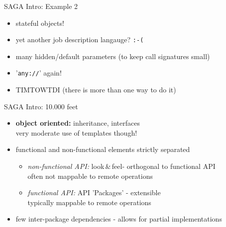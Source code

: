 \documentclass[%
  pdf,
  colorBG,
  slideColor,
  frames,
  ogf
]{prosper}
\newcommand{\T}[1]{\texttt{#1}}
\newcommand{\I}[1]{\textit{#1}}
\newcommand{\B}[1]{\textbf{#1}}
\newcommand{\dn}{\vspace*{+1em}}
\newcommand{\lf}{look\,\&\,feel\xspace}
\begin{document}

 \begin{slide}{SAGA Intro: Example 2}

  \dn\dn
  
  \begin{itemize}
   \item stateful objects!
   \item yet another job description langauge? \T{:-(}
   \item many hidden/default parameters (to keep call signatures 
   small)
   \item '\T{any://}' again!
   \item TIMTOWTDI (there is more than one way to do it)
  \end{itemize}

 \end{slide}



 \begin{slide}{SAGA Intro: 10.000 feet}

  \begin{itemize}
   
   \item \B{object oriented:} inheritance, interfaces\\
   very moderate use of templates though!

   \item functional and non-functional elements strictly separated

    \begin{itemize}

     \item \I{non-functional API:} \lf - orthogonal to functional API\\
     often not mappable to remote operations

     \item \I{functional API:} API 'Packages' - extensible\\
     typically mappable to remote operations

    \end{itemize}

   \item few inter-package dependencies - allows for partial implementations

  \end{itemize}

 \end{slide}
\end{document}
